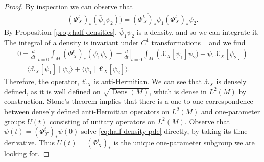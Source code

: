 \documentclass[final,leqno]{siamart}
\DeclareMathOperator{\Dens}{Dens}
\begin{document}
\begin{proof}
	By inspection we can observe that
	\begin{align*}
		 (\Phi_{X}^{t})_{*} ( \bar{\psi}_{1} \psi_{2}) ) = \overline{ (\Phi_{X}^{t})_{*} \psi_{1} } (\Phi_{X}^{t})_{*} \psi_{2}.
	\end{align*}
	By Proposition \ref{prop:half densities}, $\bar{\psi}_{1} \psi_{2}$ is a density, and so we can integrate it.
	The integral of a density is invariant under $C^{1}$ transformations ~\cite[Proposition 16.42]{Lee2006} and we find
	\begin{align*}
		0 = \left. \frac{d}{dt} \right|_{t=0} \int_{M} (\Phi_{X}^{t})_{*} (\bar{\psi}_{1} \psi_{2}) = \left. \frac{d}{dt} \right|_{t=0} \int_{M} \left( \pounds_{X}[\bar{\psi}_{1} ] \psi_{2})  + \bar{\psi}_{1} \pounds_{X}[\psi_{2}] \right) \\
		= \langle \pounds_{X}[\psi_{1}]  \mid \psi_{2} \rangle + \langle \psi_{1} \mid \pounds_{X}[\psi_{2}] \rangle.
	\end{align*}
	Therefore, the operator, $\pounds_{X}$ is anti-Hermitian.
	We can see that $\pounds_{X}$ is densely defined, as it is well defined on $\sqrt{\Dens(M)}$, which is dense in $L^{2}(M)$ by construction.
	Stone's theorem implies that there is a one-to-one correspondence between densely defined anti-Hermitian operators on $L^{2}(M)$
	and one-parameter groups $U(t)$ consisting of unitary operators on $L^{2}(M)$.
	Observe that $\psi(t) = (\Phi_{X}^{t})_{*} \psi(0)$ solve \eqref{eq:half density pde} directly, by taking its time-derivative.
	Thus $U(t) =  (\Phi_{X}^{t})_{*} $ is the unique one-parameter subgroup we are looking for.
\end{proof}
\end{document}
